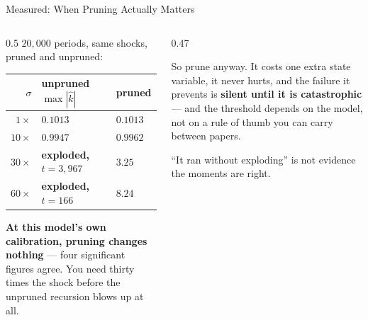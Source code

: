 \begin{frame}{Measured: When Pruning Actually Matters}
\begin{columns}[T]
\begin{column}{0.5\textwidth}
\small
$20{,}000$ periods, same shocks, pruned and unpruned:
\medskip
\begin{center}\footnotesize
\begin{tabularx}{\linewidth}{@{}r >{\raggedright\arraybackslash}X >{\raggedright\arraybackslash}X@{}}
\toprule
$\sigma$ & \textbf{unpruned} $\max|\hat{k}|$ & \textbf{pruned} \\
\midrule
$1\times$  & $0.1013$ & $0.1013$ \\
$10\times$ & $0.9947$ & $0.9962$ \\
$30\times$ & \textbf{exploded, $t=3{,}967$} & $3.25$ \\
$60\times$ & \textbf{exploded, $t=166$} & $8.24$ \\
\bottomrule
\end{tabularx}
\end{center}
\medskip
\textbf{At this model's own calibration, pruning changes nothing} --- four significant figures agree. You need thirty times the shock before the unpruned recursion blows up at all.
\end{column}
\begin{column}{0.47\textwidth}
\begin{takeawaybox}\footnotesize
So prune anyway. It costs one extra state variable, it never hurts, and the failure it prevents is \textbf{silent until it is catastrophic} --- and the threshold depends on the model, not on a rule of thumb you can carry between papers.
\end{takeawaybox}
\medskip
\begin{cautionbox}\footnotesize
``It ran without exploding'' is not evidence the moments are right.
\end{cautionbox}
\end{column}
\end{columns}
\vspace{1mm}
\end{frame}

